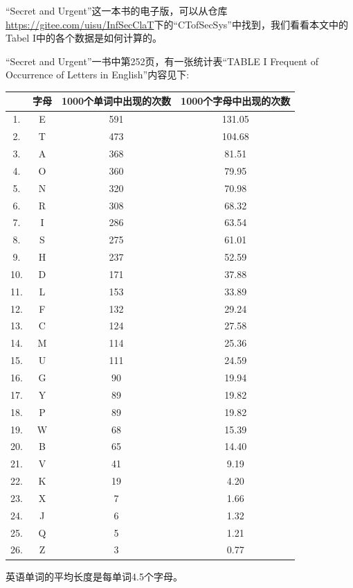 \documentclass[]{article}
\begin{document}
“Secret and Urgent”这一本书的电子版，可以从仓库\url{ https://gitee.com/uisu/InfSecClaT}下的“CTofSecSys”中找到，我们看看本文中的Tabel I中的各个数据是如何计算的。\par
“Secret and Urgent”一书中第252页，有一张统计表“TABLE I Frequent of Occurrence of Letters in English”内容见下:\\
\begin{center}
	\begin{tabular}{|c|c|c|c|}
		\hline 
		& 字母 & 1000个单词中出现的次数 & 1000个字母中出现的次数 \\ 
		\hline 
		1.& E & 591 & 131.05 \\ 
		\hline 
		2.& T & 473 & 104.68 \\ 
		\hline 
		3.& A & 368 & 81.51 \\ 
		\hline 
		4.& O & 360 & 79.95 \\ 
		\hline 
		5.& N & 320 & 70.98 \\ 
		\hline 
		6.& R & 308 & 68.32 \\ 
		\hline 
		7.& I & 286 & 63.54 \\ 
		\hline 
		8.& S & 275 & 61.01 \\ 
		\hline 
		9.& H & 237 & 52.59 \\ 
		\hline 
		10.& D & 171 & 37.88 \\ 
		\hline 
		11.& L & 153 & 33.89 \\ 
		\hline 
		12.& F & 132 & 29.24 \\ 
		\hline 
		13.& C & 124 & 27.58 \\ 
		\hline 
		14.& M & 114 & 25.36 \\ 
		\hline 
		15.& U & 111 & 24.59 \\ 
		\hline 
		16.& G & 90 & 19.94 \\ 
		\hline 
		17.& Y & 89 & 19.82 \\ 
		\hline 
		18.& P & 89 & 19.82 \\ 
		\hline 
		19.& W & 68 & 15.39 \\ 
		\hline 
		20.& B & 65 & 14.40 \\ 
		\hline 
		21.& V & 41 & 9.19 \\ 
		\hline 
		22.& K & 19 & 4.20 \\ 
		\hline 
		23.& X & 7 & 1.66 \\ 
		\hline 
		24.& J & 6 & 1.32 \\ 
		\hline 
		25.& Q & 5 & 1.21 \\ 
		\hline 
		26.& Z & 3 & 0.77 \\ 
		\hline 
	\end{tabular} \par
	英语单词的平均长度是每单词4.5个字母。
\end{center}
\end{document}
